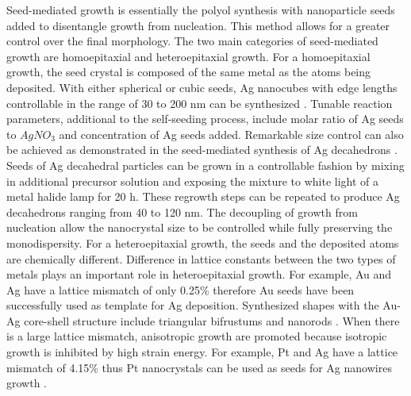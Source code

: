 Seed-mediated growth is essentially the polyol synthesis with nanoparticle seeds added to disentangle growth from nucleation.
This method allows for a greater control over the final morphology.
The two main categories of seed-mediated growth are homoepitaxial and heteroepitaxial growth.
For a homoepitaxial growth, the seed crystal is composed of the same metal as the atoms being deposited.
With either spherical or cubic seeds, Ag nanocubes with edge lengths controllable in the range of 30 to 200 nm can be synthesized \cite{Zhang_2010}.
Tunable reaction parameters, additional to the self-seeding process, include molar ratio of Ag seeds to $AgNO_3$ and concentration of Ag seeds added.
Remarkable size control can also be achieved as demonstrated in the seed-mediated synthesis of Ag decahedrons \cite{Pietrobon_2008}.
Seeds of Ag decahedral particles can be grown in a controllable fashion by mixing in additional precursor solution and exposing the mixture to white light of a metal halide lamp for 20 h.
These regrowth steps can be repeated to produce Ag decahedrons ranging from 40 to 120 nm.
The decoupling of growth from nucleation allow the nanocrystal size to be controlled while fully preserving the monodispersity.
For a heteroepitaxial growth, the seeds and the deposited atoms are chemically different.
Difference in lattice constants between the two types of metals plays an important role in heteroepitaxial growth.
For example, Au and Ag have a lattice mismatch of only 0.25\% therefore Au seeds have been successfully used as template for Ag deposition.
Synthesized shapes with the Au-Ag core-shell structure include triangular bifrustums \cite{Yoo_2009} and nanorods \cite{Seo_2008,Tsuji_2006}.
When there is a large lattice mismatch, anisotropic growth are promoted because isotropic growth is inhibited by high strain energy.
For example, Pt and Ag have a lattice mismatch of 4.15\% thus Pt nanocrystals can be used as seeds for Ag nanowires growth \cite{Sun_2002,Sun_2002b,Tsuji_2008b}.
  
  